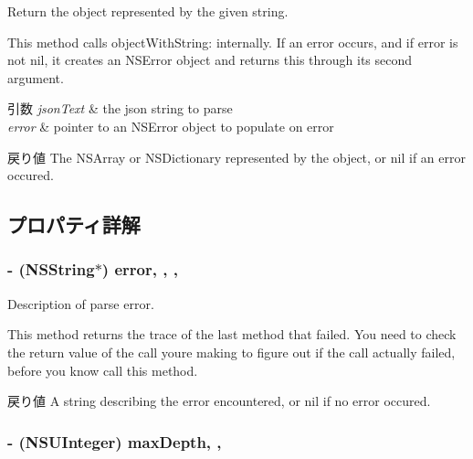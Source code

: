 Return the object represented by the given string. 

This method calls object\+With\+String\+: internally. If an error occurs, and if {\ttfamily error} is not nil, it creates an N\+S\+Error object and returns this through its second argument.


\begin{DoxyParams}{引数}
{\em json\+Text} & the json string to parse \\
\hline
{\em error} & pointer to an N\+S\+Error object to populate on error\\
\hline
\end{DoxyParams}
\begin{DoxyReturn}{戻り値}
The N\+S\+Array or N\+S\+Dictionary represented by the object, or nil if an error occured. 
\end{DoxyReturn}


\subsection{プロパティ詳解}
\hypertarget{interface_s_b_json_parser_ad80719ec3d8be2bc45f06ec9c804997d}{}
\subsubsection[{error}]{\setlength{\rightskip}{0pt plus 5cm}-\/ (N\+S\+String$\ast$) error\hspace{0.3cm}{\ttfamily [read]}, {\ttfamily [write]}, {\ttfamily [atomic]}, {\ttfamily [copy]}}\label{interface_s_b_json_parser_ad80719ec3d8be2bc45f06ec9c804997d}


Description of parse error. 

This method returns the trace of the last method that failed. You need to check the return value of the call you\textquotesingle{}re making to figure out if the call actually failed, before you know call this method.

\begin{DoxyReturn}{戻り値}
A string describing the error encountered, or nil if no error occured. 
\end{DoxyReturn}
\hypertarget{interface_s_b_json_parser_a0378b4ce99a1caeddc4a05da37ca4ffa}{}
\subsubsection[{max\+Depth}]{\setlength{\rightskip}{0pt plus 5cm}-\/ (N\+S\+U\+Integer) max\+Depth\hspace{0.3cm}{\ttfamily [read]}, {\ttfamily [write]}, {\ttfamily [atomic]}}\label{interface_s_b_json_parser_a0378b4ce99a1caeddc4a05da37ca4ffa}


